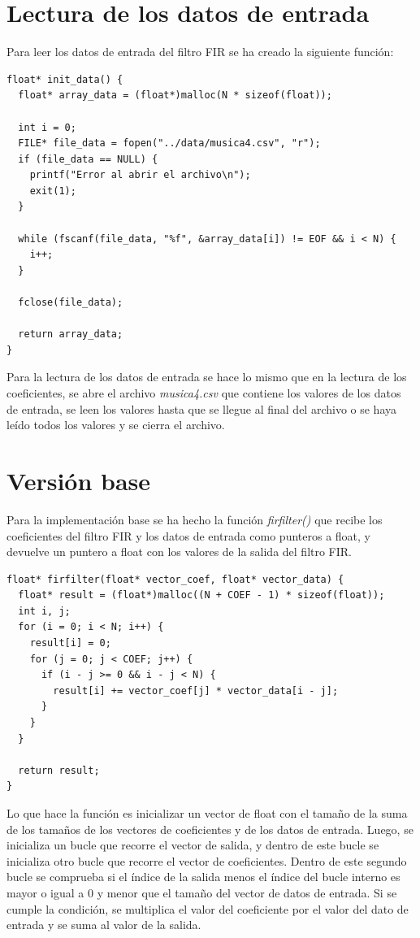 \documentclass[11pt]{report}
\begin{document}
\section*{Lectura de los datos de entrada}
Para leer los datos de entrada del filtro FIR se ha creado la siguiente función:
\begin{lstlisting}
float* init_data() {
  float* array_data = (float*)malloc(N * sizeof(float));

  int i = 0;
  FILE* file_data = fopen("../data/musica4.csv", "r");
  if (file_data == NULL) {
    printf("Error al abrir el archivo\n");
    exit(1);
  }

  while (fscanf(file_data, "%f", &array_data[i]) != EOF && i < N) {
    i++;
  }

  fclose(file_data);

  return array_data;
}
\end{lstlisting}

Para la lectura de los datos de entrada se hace lo mismo que en la lectura de los coeficientes, se abre el archivo \emph{musica4.csv} que contiene
los valores de los datos de entrada, se leen los valores hasta que se llegue al final del archivo o se haya leído todos los valores y se cierra el archivo.

\newpage

\section{Versión base}
Para la implementación base se ha hecho la función \emph{firfilter()} que recibe los coeficientes del filtro FIR y los datos de entrada como punteros a float,
y devuelve un puntero a float con los valores de la salida del filtro FIR.

\begin{lstlisting}
float* firfilter(float* vector_coef, float* vector_data) {
  float* result = (float*)malloc((N + COEF - 1) * sizeof(float));
  int i, j;
  for (i = 0; i < N; i++) {
    result[i] = 0;
    for (j = 0; j < COEF; j++) {
      if (i - j >= 0 && i - j < N) {
        result[i] += vector_coef[j] * vector_data[i - j];
      }
    }
  }

  return result;
}
\end{lstlisting}

Lo que hace la función es inicializar un vector de float con el tamaño de la suma de los tamaños de los vectores de coeficientes y de los datos de entrada.
Luego, se inicializa un bucle que recorre el vector de salida, y dentro de este bucle se inicializa otro bucle que recorre el vector de coeficientes.
Dentro de este segundo bucle se comprueba si el índice de la salida menos el índice del bucle interno es mayor o igual a 0 y menor que el tamaño del vector de datos de entrada.
Si se cumple la condición, se multiplica el valor del coeficiente por el valor del dato de entrada y se suma al valor de la salida.
\end{document}
